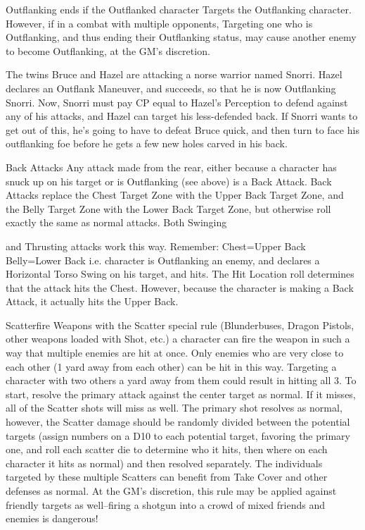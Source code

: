 \documentclass[oneside,11pt,english]{book}
\begin{document}
 

Outflanking ends if the Outflanked character Targets the Outflanking character. However, if in a combat 
with multiple opponents, Targeting one who is Outflanking, and thus ending their Outflanking status, may 
cause another enemy to become Outflanking, at the GM’s discretion. 

 

The twins Bruce and Hazel are attacking a norse warrior named Snorri. Hazel declares an Outflank 
Maneuver, and succeeds, so that he is now Outflanking Snorri. Now, Snorri must pay CP equal to Hazel’s 
Perception to defend against any of his attacks, and Hazel can target his less-defended back. If Snorri 
wants to get out of this, he’s going to have to defeat Bruce quick, and then turn to face his outflanking foe 
before he gets a few new holes carved in his back. 

 

Back Attacks 
Any attack made from the rear, either because a character has snuck up on his target or is Outflanking 
(see above) is a Back Attack. 
Back Attacks replace the Chest Target Zone with the Upper Back Target Zone, and the Belly Target Zone 
with the Lower Back Target Zone, but otherwise roll exactly the same as normal attacks. Both Swinging 


and Thrusting attacks work this way. 
Remember: 
Chest=Upper Back 
Belly=Lower Back 
i.e. character is Outflanking an enemy, and declares a Horizontal Torso Swing on his target, and hits. The 
Hit Location roll determines that the attack hits the Chest. However, because the character is making a 
Back Attack, it actually hits the Upper Back. 

 

Scatterfire 
Weapons with the Scatter special rule (Blunderbuses, Dragon Pistols, other weapons loaded with Shot, 
etc.) a character can fire the weapon in such a way that multiple enemies are hit at once. Only enemies 
who are very close to each other (1 yard away from each other) can be hit in this way. Targeting a 
character with two others a yard away from them could result in hitting all 3. 
To start, resolve the primary attack against the center target as normal. If it misses, all of the Scatter shots 
will miss as well. The primary shot resolves as normal, however, the Scatter damage should be randomly 
divided between the potential targets (assign numbers on a D10 to each potential target, favoring the 
primary one, and roll each scatter die to determine who it hits, then where on each character it hits as 
normal) and then resolved separately. 
The individuals targeted by these multiple Scatters can benefit from Take Cover and other defenses as 
normal. 
At the GM’s discretion, this rule may be applied against friendly targets as well--firing a shotgun into a 
crowd of mixed friends and enemies is dangerous! 
\end{document}
